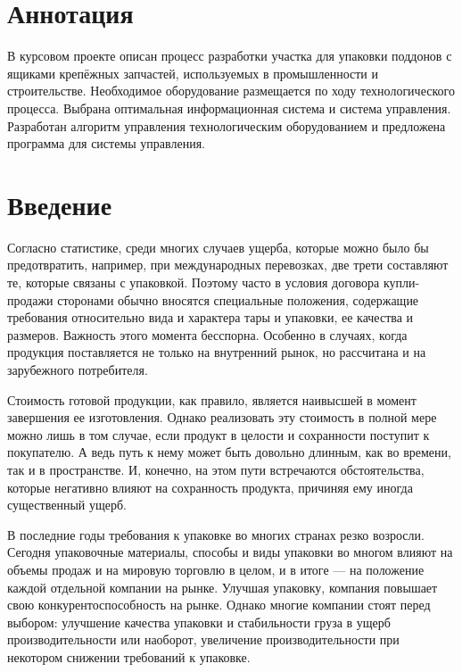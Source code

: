 \section*{Аннотация}

В курсовом проекте описан процесс разработки участка для упаковки поддонов с ящиками крепёжных запчастей, используемых в промышленности и строительстве. Необходимое оборудование размещается по ходу технологического процесса. Выбрана оптимальная информационная система и система управления. Разработан алгоритм управления технологическим оборудованием и предложена программа для системы управления.

\section*{Введение}

Согласно статистике, среди многих случаев ущерба, которые можно было бы предотвратить, например, при международных перевозках, две трети составляют те, которые связаны с упаковкой. Поэтому часто в условия договора купли-продажи сторонами обычно вносятся специальные положения, содержащие требования относительно вида и характера тары и упаковки, ее качества и размеров. Важность этого момента бесспорна. Особенно в случаях, когда продукция поставляется не только на внутренний рынок, но рассчитана и на зарубежного потребителя. 

Стоимость готовой продукции, как правило, является наивысшей в момент завершения ее изготовления. Однако реализовать эту стоимость в полной мере можно лишь в том случае, если продукт в целости и сохранности поступит к покупателю. А ведь путь к нему может быть довольно длинным, как во времени, так и в пространстве. И, конечно, на этом пути встречаются обстоятельства, которые негативно влияют на сохранность продукта, причиняя ему иногда существенный ущерб. 

В последние годы требования к упаковке во многих странах резко возросли. Сегодня упаковочные материалы, способы и виды упаковки во многом влияют на объемы продаж и на мировую торговлю в целом, и в итоге --- на положение каждой отдельной компании на рынке. Улучшая упаковку, компания повышает свою конкурентоспособность на рынке. Однако многие компании стоят перед выбором: улучшение качества упаковки и стабильности груза в ущерб производительности или наоборот, увеличение производительности при некотором снижении требований к упаковке. 

